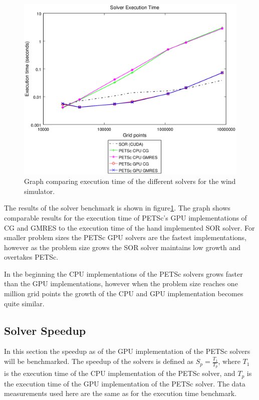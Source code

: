 \begin{figure}[ht]
	\center
	\includegraphics[width=1.0\textwidth]{results/data/sb/exec_time_all}
	\caption{Graph comparing execution time of the different solvers for the
		wind simulator.}
	\label{fig:sb_exec_time_all}
\end{figure}

The results of the solver benchmark is shown in figure\ref{fig:sb_exec_time_all}.
The graph shows comparable results for the execution time of PETSc's GPU
implementations of CG and GMRES to the execution time of the hand implemented
SOR solver. For smaller problem sizes the PETSc GPU solvers are the fastest
implementations, however as the problem size grows the SOR solver maintains
low growth and overtakes PETSc.

In the beginning the CPU implementations of the
PETSc solvers grows faster than the GPU implementations, however when the
problem size reaches one million grid points the growth of the CPU and GPU
implementation becomes quite similar.

\subsection{Solver Speedup}

In this section the speedup as of the GPU implementation of the PETSc solvers will
be benchmarked. The speedup of the solvers is defined as $S_p = \frac{T_1}{T_p}$,
where $T_1$ is the execution time of the CPU implementation of the PETSc solver,
and $T_p$ is the execution time of the GPU implementation of the PETSc solver.
The data measurements used here are the same as for the execution time benchmark.

